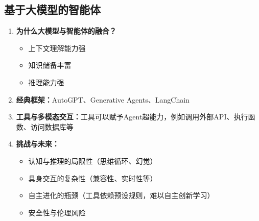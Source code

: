 \documentclass[../main.tex]{subfiles}
\begin{document}
\subsection{基于大模型的智能体}\label{sec:llm-agent}
\begin{enumerate}
    \item \textbf{为什么大模型与智能体的融合？}
    \begin{itemize}
        \item 上下文理解能力强
        \item 知识储备丰富
        \item 推理能力强
    \end{itemize}
    
    \item \textbf{经典框架：}AutoGPT、Generative Agents、LangChain
    \item \textbf{工具与多模态交互：}工具可以赋予Agent超能力，例如调用外部API、执行函数、访问数据库等
    \item \textbf{挑战与未来：}
    \begin{itemize}
        \item 认知与推理的局限性（思维循环、幻觉）
        \item 具身交互的复杂性（兼容性、实时性等）
        \item 自主进化的瓶颈（工具依赖预设规则，难以自主创新学习）
        \item 安全性与伦理风险
    \end{itemize}
\end{enumerate}
\end{document}
